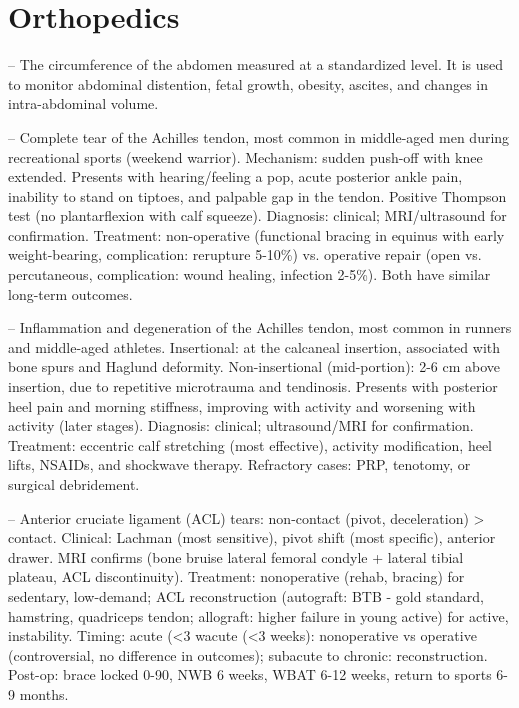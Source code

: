 \chapter{Orthopedics}

-- The circumference of the abdomen measured at a standardized level. It is used to monitor abdominal distention, fetal growth, obesity, ascites, and changes in intra-abdominal volume.

-- Complete tear of the Achilles tendon, most common in middle-aged men during recreational sports (weekend warrior). Mechanism: sudden push-off with knee extended. Presents with hearing/feeling a pop, acute posterior ankle pain, inability to stand on tiptoes, and palpable gap in the tendon. Positive Thompson test (no plantarflexion with calf squeeze). Diagnosis: clinical; MRI/ultrasound for confirmation. Treatment: non-operative (functional bracing in equinus with early weight-bearing, complication: rerupture 5-10\%) vs. operative repair (open vs. percutaneous, complication: wound healing, infection 2-5\%). Both have similar long-term outcomes.

-- Inflammation and degeneration of the Achilles tendon, most common in runners and middle-aged athletes. Insertional: at the calcaneal insertion, associated with bone spurs and Haglund deformity. Non-insertional (mid-portion): 2-6 cm above insertion, due to repetitive microtrauma and tendinosis. Presents with posterior heel pain and morning stiffness, improving with activity and worsening with activity (later stages). Diagnosis: clinical; ultrasound/MRI for confirmation. Treatment: eccentric calf stretching (most effective), activity modification, heel lifts, NSAIDs, and shockwave therapy. Refractory cases: PRP, tenotomy, or surgical debridement.

-- Anterior cruciate ligament (ACL) tears: non-contact (pivot, deceleration) > contact. Clinical: Lachman (most sensitive), pivot shift (most specific), anterior drawer. MRI confirms (bone bruise lateral femoral condyle + lateral tibial plateau, ACL discontinuity). Treatment: nonoperative (rehab, bracing) for sedentary, low-demand; ACL reconstruction (autograft: BTB - gold standard, hamstring, quadriceps tendon; allograft: higher failure in young active) for active, instability. Timing: acute (<3 wacute (<3 weeks): nonoperative vs operative (controversial, no difference in outcomes); subacute to chronic: reconstruction. Post-op: brace locked 0-90, NWB 6 weeks, WBAT 6-12 weeks, return to sports 6-9 months.

